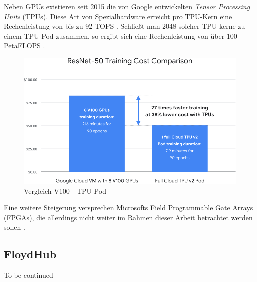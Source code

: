 Neben GPUs existieren seit 2015 die von Google entwickelten \textit{Tensor Processing Units} (TPUs). Diese Art von Spezialhardware erreicht pro TPU-Kern eine Rechenleistung von bis zu 92 TOPS \cite{HaraldBogeholz.20170406}. Schließt man 2048 solcher TPU-kerne zu einem TPU-Pod zusammen, so ergibt sich eine Rechenleistung von über 100 PetaFLOPS \cite{GoogleCloud.20200209}. 

\begin{figure}[ht]
	\begin{center}
		\includegraphics[width=14cm]{Bilder/tpu_comparison.png} 
		\caption[Vergleich V100 - TPU Pod]{Vergleich V100 - TPU Pod \cite{GoogleCloud.20200209b}}
		\label{tpu}
	\end{center}
\end{figure}

Eine weitere Steigerung versprechen Microsofts Field Programmable Gate Arrays (FPGAs), die allerdings nicht weiter im Rahmen dieser Arbeit betrachtet werden sollen \cite{KarlFreund.20170828}.

\subsection{FloydHub}

To be continued
